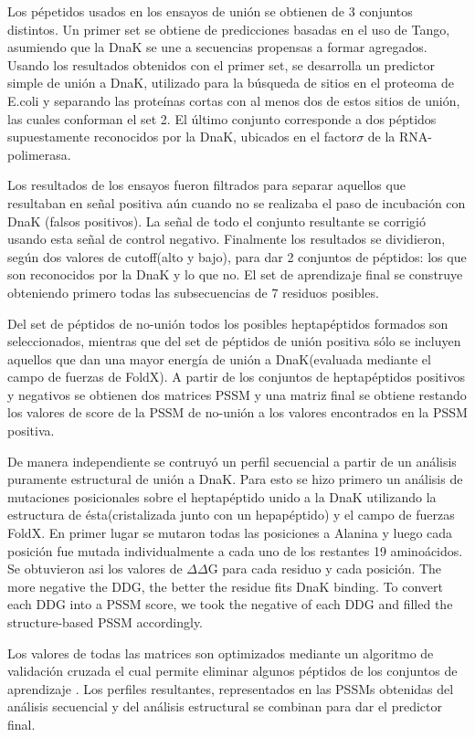 Los pépetidos usados en los ensayos de unión se obtienen de 3 conjuntos distintos. Un primer set se obtiene de predicciones basadas en el uso de Tango, asumiendo que la DnaK se une a secuencias propensas a formar agregados.
Usando los resultados obtenidos con el primer set, se desarrolla un predictor simple de unión a DnaK, utilizado para la búsqueda de sitios en el proteoma de E.coli 
y separando las proteínas cortas con al menos dos de estos sitios de unión, las cuales conforman el set 2. El último conjunto corresponde a dos péptidos supuestamente reconocidos por la DnaK, ubicados en el factor$\sigma$ de la RNA-polimerasa.

Los resultados de los ensayos fueron filtrados para separar aquellos que resultaban en señal positiva aún cuando no se realizaba el paso de incubación con DnaK (falsos positivos). 
La señal de todo el conjunto resultante se corrigió usando esta señal de control negativo. Finalmente los resultados se dividieron, según dos valores de cutoff(alto y bajo), para dar 2 conjuntos de péptidos:
los que son reconocidos por la DnaK y lo que no. El set de aprendizaje final se construye obteniendo primero todas las subsecuencias de 7 residuos posibles. 

Del set de péptidos de no-unión todos los posibles heptapéptidos formados son seleccionados, 
mientras que del set de péptidos de unión positiva sólo se incluyen aquellos que dan una mayor energía de unión a DnaK(evaluada mediante el campo de fuerzas de FoldX).
A partir de los conjuntos de heptapéptidos positivos y negativos se obtienen dos matrices PSSM y una matriz final se obtiene restando los valores de score de la PSSM de no-unión a los valores encontrados en la PSSM positiva.

De manera independiente se contruyó un perfil secuencial a partir de un análisis puramente estructural de unión a DnaK.
Para esto se hizo primero un análisis de mutaciones posicionales sobre el heptapéptido unido a la DnaK utilizando la estructura de ésta(cristalizada junto con un hepapéptido) y el campo de fuerzas FoldX. 
En primer lugar se mutaron todas las posiciones a Alanina y luego cada posición fue mutada individualmente a cada uno de los restantes 19 aminoácidos.
Se obtuvieron asi los valores de $\Delta\Delta$G para cada residuo y cada posición. 
The more
negative the DDG, the better the residue fits DnaK binding. To
convert each DDG into a PSSM score, we took the negative of
each DDG and filled the structure-based PSSM accordingly.


Los valores de todas las matrices son optimizados mediante un algoritmo de validación cruzada el cual permite eliminar algunos péptidos de los conjuntos de aprendizaje .
Los perfiles resultantes, representados en las PSSMs obtenidas del análisis secuencial y del análisis estructural se combinan para dar el predictor final. 



